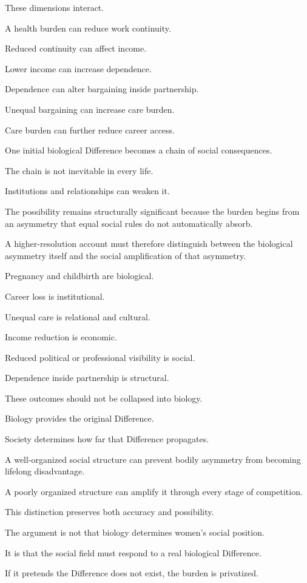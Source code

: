 These dimensions interact.

A health burden can reduce work continuity.

Reduced continuity can affect income.

Lower income can increase dependence.

Dependence can alter bargaining inside partnership.

Unequal bargaining can increase care burden.

Care burden can further reduce career access.

One initial biological Difference becomes a chain of social consequences.

The chain is not inevitable in every life.

Institutions and relationships can weaken it.

The possibility remains structurally significant because the burden begins from an asymmetry that equal social rules do not automatically absorb.

A higher-resolution account must therefore distinguish between the biological asymmetry itself and the social amplification of that asymmetry.

Pregnancy and childbirth are biological.

Career loss is institutional.

Unequal care is relational and cultural.

Income reduction is economic.

Reduced political or professional visibility is social.

Dependence inside partnership is structural.

These outcomes should not be collapsed into biology.

Biology provides the original Difference.

Society determines how far that Difference propagates.

A well-organized social structure can prevent bodily asymmetry from becoming lifelong disadvantage.

A poorly organized structure can amplify it through every stage of competition.

This distinction preserves both accuracy and possibility.

The argument is not that biology determines women’s social position.

It is that the social field must respond to a real biological Difference.

If it pretends the Difference does not exist, the burden is privatized.


